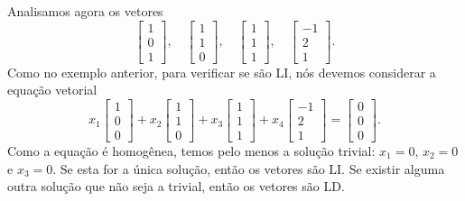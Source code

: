 \begin{ex}\label{exp:2}
Analisamos agora os vetores
\begin{equation}
\left[
  \begin{array}{c}
    1 \\
    0 \\
    1 
  \end{array}
\right], \quad
\left[
  \begin{array}{c}
    1 \\
    1 \\
    0 
  \end{array}
\right], \quad
\left[
  \begin{array}{c}
    1 \\
    1 \\
    1 
  \end{array}
\right], \quad
\left[
  \begin{array}{c}
    -1 \\
    2 \\
    1 
  \end{array}
\right].
\end{equation} Como no exemplo anterior, para verificar se são LI, nós devemos considerar a equação vetorial
\begin{equation}
x_1 \left[
  \begin{array}{c}
    1 \\
    0 \\
    0 
  \end{array}
\right] +
x_2\left[
  \begin{array}{c}
    1 \\
    1 \\
    0 
  \end{array}
\right] +
x_3\left[
  \begin{array}{c}
    1 \\
    1 \\
    1 
  \end{array}
\right]+
x_4\left[
  \begin{array}{c}
    -1 \\
    2 \\
    1 
  \end{array}
\right] =
\left[
  \begin{array}{c}
    0 \\
    0 \\
    0 
  \end{array}
\right].
\end{equation} Como a equação é homogênea, temos pelo menos a solução trivial: $x_1 = 0$, $x_2=0$ e $x_3 = 0$. Se esta for a única solução, então os vetores são LI. Se existir alguma outra solução que não seja a trivial, então os vetores são LD.


\end{ex}
